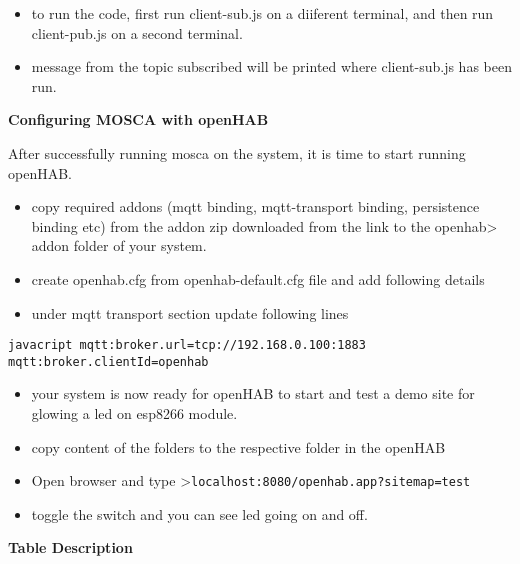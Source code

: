 \documentclass[16pt]{article}
\begin{document}
\begin{itemize}

\item
  to run the code, first run client-sub.js on a diiferent terminal, and
  then run client-pub.js on a second terminal.
\item
  message from the topic subscribed will be printed where client-sub.js
  has been run.
\end{itemize}

{\Large{\textbf{Configuring MOSCA with
openHAB}}}


After successfully running mosca on the system, it is time to start
running openHAB.

\begin{itemize}

\item
  copy required addons (mqtt binding, mqtt-transport binding,
  persistence binding etc) from the addon zip downloaded from the
  link to the openhab\textgreater{} addon folder of your system.
\item
  create openhab.cfg from openhab-default.cfg file and add following
  details
\item
  under mqtt transport section update following lines
\end{itemize}

\texttt{javacript       mqtt:broker.url=tcp://192.168.0.100:1883       mqtt:broker.clientId=openhab}

\begin{itemize}


\item your system is now ready for openHAB to start and test a demo site for
glowing a led on esp8266 module.
\item copy content of the folders to the
respective folder in the openHAB 
\item Open browser and type
\textgreater{}\texttt{localhost:8080/openhab.app?sitemap=test}
\item toggle
the switch and you can see led going on and off.

\end{itemize}

\vspace{5cm}
{\Large{\textbf{Table Description}}}
\end{document}
